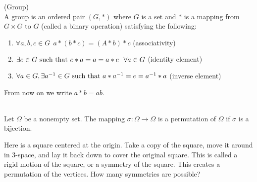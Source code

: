 \begin{definition}(Group) \leavevmode \\
    A group is an ordered pair $(G, *)$ where $G$ is a set and $*$ is a mapping from $G\times G$ to $G$ (called a binary operation) satisfying the following:
    \begin{enumerate}
        \item $\forall a, b, c \in G ~~a*(b*c)=(A*b)*c$ (associativity)
        \item $\exists e \in G \text{ such that } e*a=a=a*e ~~\forall a \in G$ (identity element)
        \item $\forall a \in G, \exists a^{-1} \in G \text{ such that } a*a^{-1}=e=a^{-1}*a$ (inverse element)
    \end{enumerate}
\end{definition}

From now on we write $a*b = ab$.

\begin{definition}[Permutations] \leavevmode \\
    Let $\Omega$ be a nonempty set. The mapping $\sigma: \Omega \to \Omega$ is a permutation of $\Omega$ if $\sigma$ is a bijection.
\end{definition} %
\begin{wrapfigure}{l}{0.35\textwidth} %
  \centering
\end{wrapfigure}

Here is a square centered at the origin. Take a copy of the square, move it around in 3-space, and lay it back down to cover the original square. This is called a rigid motion of the square, or a symmetry of the square. This creates a permutation of the vertices. How many symmetries are possible?

